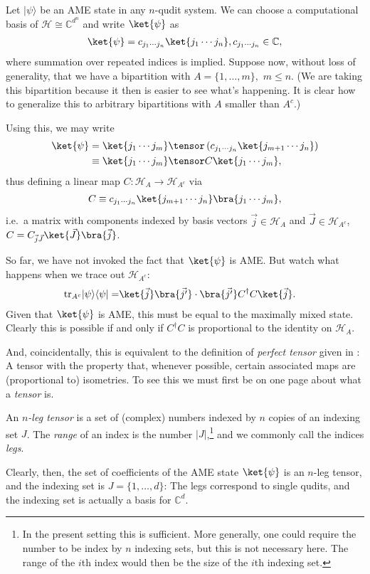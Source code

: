 \bigno
Let $|\psi\rangle$ be an AME state in any $n$-qudit system. We can choose a computational basis of $\mathcal{H}\cong\mathbb{C}^{d^n}$ and write $\ket{\psi}$ as
\begin{align*}
\ket{\psi} = c_{j_1 \cdots j_n} \ket{j_1 \cdots j_n}, c_{j_1 \cdots j_n}\in\mathbb{C},
\end{align*}
where summation over repeated indices is implied. Suppose now, without loss of generality, that we have a bipartition with $A=\{1, \ldots, m\},$ $m\leq n$. (We are taking this bipartition because it then is easier to see what's happening. It is clear how to generalize this to arbitrary bipartitions with $A$ smaller than $A^c$.)

Using this, we may write
\begin{align*}
\ket{\psi} &= \ket{j_1\cdots j_m} \tensor \left( c_{j_1 \cdots j_n} \ket{j_{m+1}\cdots j_n}\right) \\
&\equiv \ket{j_1\cdots j_m} \tensor C\ket{j_1\cdots j_m},
\end{align*}
thus defining a linear map $C  :\mathcal{H}_A \rightarrow \mathcal{H}_{A^c}$ via
\begin{align}\label{eq:mapfrombipartition}
C \equiv c_{j_1 \cdots j_n} \ket{j_{m+1}\cdots j_n} \bra{j_1\cdots j_m},
\end{align}
i.e.\  a matrix with components indexed by basis vectors $\vec{j}\in\mathcal{H}_A$ and $\vec{J}\in\mathcal{H}_{A^c}$, $C=C_{\vec{j}\vec{J}}\ket{\vec{J}}\bra{\vec{j}}$.

So far, we have not invoked the fact that $\ket{\psi}$ is AME. But watch what happens when we trace out $\mathcal{H}_{A^c}:$
\begin{align*}
\mathrm{tr}_{A^c} |\psi\rangle\langle\psi|  
=& \ket{\vec{j}} \bra{\vec{j^\prime}}    \cdot   \bra{\vec{j^\prime}}C^\dagger C\ket{\vec{j}}.
\end{align*}
Given that $\ket{\psi}$ is AME, this must be equal to the maximally mixed state. Clearly this is possible if and only if $C^\dagger C$ is proportional to the identity on $\mathcal{H}_A$.

And, coincidentally, this is equivalent to the definition of \emph{perfect tensor} given in \cite{Pastawski2015Holographic}: A tensor with the property that, whenever possible, certain associated maps are (proportional to) isometries. To see this we must first be on one page about what a \emph{tensor} is.

\begin{definition}[Tensor]\label{def:tensor}
An \emph{$n$-leg tensor} is a set of (complex) numbers indexed by $n$ copies of an indexing set $J$. The \emph{range} of an index is the number $\lvert J \rvert$,\footnote{In the present setting this is sufficient. More generally, one could require the number to be index by $n$ indexing sets, but this is not necessary here. The range of the $i$th index would then be the size of the $i$th indexing set.} and we commonly call the indices \emph{legs}.
\end{definition}
Clearly, then, the set of coefficients of the AME state $\ket{\psi}$ is an  $n$-leg tensor, and the indexing set is $J=\{1, \ldots, d\}$: The legs correspond to single qudits, and the indexing set is actually a basis for $\mathbb{C}^d$. 

